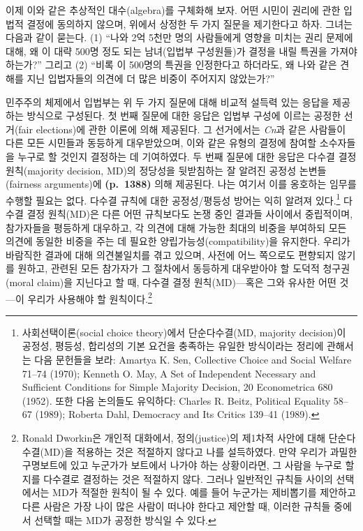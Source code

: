 \documentclass[a4paper,12pt,oneside]{article}  %
\begin{document}
이제 이와 같은 추상적인 대수(algebra)를 구체화해 보자. 어떤 시민이
권리에 관한 입법적 결정에 동의하지 않으며, 위에서 상정한 두 가지 질문을
제기한다고 하자. 그녀는 다음과 같이 묻는다. (1) ``나와 2억 5천만 명의
사람들에게 영향을 미치는 권리 문제에 대해, 왜 이 대략 500명 정도 되는
남녀(입법부 구성원들)가 결정을 내릴 특권을 가져야 하는가?'' 그리고 (2)
``비록 이 500명의 특권을 인정한다고 하더라도, 왜 나와 같은 견해를 지닌
입법자들의 의견에 더 많은 비중이 주어지지 않았는가?''

민주주의 체제에서 입법부는 위 두 가지 질문에 대해 비교적 설득력 있는
응답을 제공하는 방식으로 구성된다. 첫 번째 질문에 대한 응답은 입법부
구성에 이르는 공정한 선거(fair elections)에 관한 이론에 의해 제공된다.
그 선거에서는 \emph{Cn}과 같은 사람들이 다른 모든 시민들과 동등하게
대우받았으며, 이와 같은 유형의 결정에 참여할 소수자들을 누구로 할 것인지
결정하는 데 기여하였다. 두 번째 질문에 대한 응답은 다수결 결정
원칙(majority decision, MD)의 정당성을 뒷받침하는 잘 알려진 공정성
논변들(fairness arguments)에 \textbf{(p.~1388)} 의해 제공된다. 나는
여기서 이를 옹호하는 임무를 수행할 필요는 없다. 다수결 규칙에 대한
공정성/평등성 방어는 익히 알려져 있다.\footnote{사회선택이론(social
  choice theory)에서 단순다수결(MD, majority decision)이 공정성, 평등성,
  합리성의 기본 요건을 충족하는 유일한 방식이라는 정리에 관해서는 다음
  문헌들을 보라: Amartya K. Sen, Collective Choice and Social Welfare
  71--74 (1970); Kenneth O. May, A Set of Independent Necessary and
  Sufficient Conditions for Simple Majority Decision, 20 Econometrica
  680 (1952). 또한 다음 논의들도 유익하다: Charles R. Beitz, Political
  Equality 58--67 (1989); Roberta Dahl, Democracy and Its Critics
  139--41 (1989).} 다수결 결정 원칙(MD)은 다른 어떤 규칙보다도 논쟁 중인
결과들 사이에서 중립적이며, 참가자들을 평등하게 대우하고, 각 의견에 대해
가능한 최대의 비중을 부여하되 모든 의견에 동일한 비중을 주는 데 필요한
양립가능성(compatibility)을 유지한다. 우리가 바람직한 결과에 대해
의견불일치를 겪고 있으며, 사전에 어느 쪽으로도 편향되지 않기를 원하고,
관련된 모든 참가자가 그 절차에서 동등하게 대우받아야 할 도덕적
청구권(moral claim)을 지닌다고 할 때, 다수결 결정 원칙(MD)---혹은 그와
유사한 어떤 것---이 우리가 사용해야 할 원칙이다.\footnote{Ronald
  Dworkin은 개인적 대화에서, 정의(justice)의 제1차적 사안에 대해
  단순다수결(MD)을 적용하는 것은 적절하지 않다고 나를 설득하였다. 만약
  우리가 과밀한 구명보트에 있고 누군가가 보트에서 나가야 하는
  상황이라면, 그 사람을 누구로 할지를 다수결로 결정하는 것은 적절하지
  않다. 그러나 일반적인 규칙들 사이의 선택에서는 MD가 적절한 원칙이 될
  수 있다. 예를 들어 누군가는 제비뽑기를 제안하고 다른 사람은 가장 나이
  많은 사람이 떠나야 한다고 제안할 때, 이러한 규칙들 중에서 선택할 때는
  MD가 공정한 방식일 수 있다.}
\end{document}
